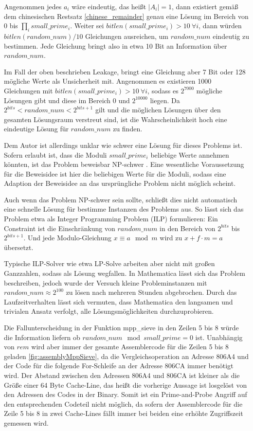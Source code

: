 Angenommen jedes $a_i$ wäre eindeutig, das heißt $|A_i|=1$, dann existiert gemäß dem chinesischen Restsatz \ref{chinese_remainder} genau eine Lösung im Bereich von $0$ bis $\prod_i small\_prime_i$.
Weiter sei $bitlen(small\_prime_i) > 10 \: \forall i$, dann würden $bitlen(random\_num)/10$ Gleichungen ausreichen, um $random\_num$ eindeutig zu bestimmen.
Jede Gleichung bringt also in etwa 10 Bit an Information über $random\_num$.

Im Fall der oben beschrieben Leakage, bringt eine Gleichung aber 7 Bit oder 128 mögliche Werte als Unsicherheit mit.
Angenommen es existieren 1000 Gleichungen mit $bitlen(small\_prime_i) > 10 \: \forall i$, sodass es $2^{7000}$ mögliche Lösungen gibt und diese im Bereich 0 und $2^{10000}$ liegen.
Da $2^{bits} < random\_num < 2^{bits+1}$ gilt und die möglichen Lösungen über den gesamten Lösungsraum verstreut sind, ist die Wahrscheinlichkeit hoch eine eindeutige Lösung für $random\_num$ zu finden.

Dem Autor ist allerdings unklar wie schwer eine Lösung für dieses Problems ist.
Sofern erlaubt ist, dass die Moduli $small\_prime_i$ beliebige Werte annehmen könnten, ist das Problem beweisbar NP-schwer \cite{FuzzyCRTProof}.
Eine wesentliche Voraussetzung für die Beweisidee ist hier die beliebigen Werte für die Moduli, sodass eine Adaption der Beweisidee an das ursprüngliche Problem nicht möglich scheint.

Auch wenn das Problem NP-schwer sein sollte, schließt dies nicht automatisch eine schnelle Lösung für bestimme Instanzen des Problems aus.
So lässt sich das Problem etwa als Integer Programming Problem (ILP) formulieren:
Ein Constraint ist die Einschränkung von $random\_num$ in den Bereich von $2^{bits}$ bis $2^{bits+1}$.
Und jede Modulo-Gleichung $x \equiv a \mod m$ wird zu $x + f \cdot m = a$ übersetzt.

Typische ILP-Solver wie etwa LP-Solve arbeiten aber nicht mit großen Ganzzahlen, sodass als Lösung wegfallen.
In Mathematica lässt sich das Problem beschreiben, jedoch wurde der Versuch kleine Probleminstanzen mit $random\_num \approx 2^100$ zu lösen nach mehreren Stunden abgebrochen.
Durch das Laufzeitverhalten lässt sich vermuten, dass Mathematica den langsamen und trivialen Ansatz verfolgt, alle Lösungsmöglichkeiten durchzuprobieren.

Die Fallunterscheidung in der Funktion mpp_sieve in den Zeilen 5 bis 8 würde die Information liefern ob $random\_num \mod small\_prime = 0$ ist.
Unabhängig von $rem$ wird aber immer der gesamte Assemblercode für die Zeilen 5 bis 8 geladen \ref{fig:assemblyMppSieve}, da die Vergleichsoperation an Adresse 806A4 und der Code für die folgende For-Schleife an der Adresse 806CA immer benötigt wird.
Der Abstand zwischen den Adressen 806A4 und 806CA ist kleiner als die Größe einer 64 Byte Cache-Line, das heißt die vorherige Aussage ist losgelöst von den Adressen des Codes in der Binary.
Somit ist ein Prime-and-Probe Angriff auf den entsprechenden Codeteil nicht möglich, da sofern der Assemblercode für die Zeile 5 bis 8 in zwei Cache-Lines fällt immer bei beiden eine erhöhte Zugriffszeit gemessen wird.

